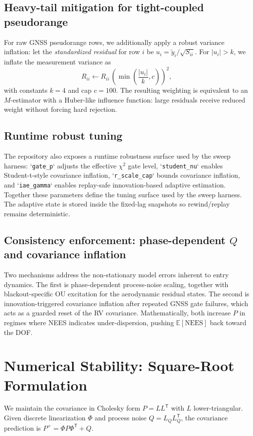 \documentclass[10pt]{article}
\newcommand{\E}{\mathbb{E}}
\newcommand{\trans}{^{\mathsf T}}
\begin{document}
\subsection{Heavy-tail mitigation for tight-coupled pseudorange}
For raw GNSS pseudorange rows, we additionally apply a robust variance inflation:
let the \emph{standardized residual} for row $i$ be $u_i=\tilde y_i/\sqrt{S_{ii}}$.
For $|u_i|>k$, we inflate the measurement variance as
\begin{equation}
  R_{ii} \leftarrow R_{ii}\,\left(\min\!\left(\frac{|u_i|}{k},c\right)\right)^2,
\end{equation}
with constants $k=4$ and cap $c=100$.
The resulting weighting is equivalent to an $M$-estimator with a Huber-like influence function:
large residuals receive reduced weight without forcing hard rejection.

\subsection{Runtime robust tuning}
The repository also exposes a runtime robustness surface used by the sweep harness:
`\texttt{gate\_p}` adjusts the effective $\chi^2$ gate level, `\texttt{student\_nu}` enables Student-t-style covariance inflation, `\texttt{r\_scale\_cap}` bounds covariance inflation, and `\texttt{iae\_gamma}` enables replay-safe innovation-based adaptive estimation. Together these parameters define the tuning surface used by the sweep harness.
The adaptive state is stored inside the fixed-lag snapshots so rewind/replay remains deterministic.

\subsection[Consistency enforcement: phase-dependent Q]{Consistency enforcement: phase-dependent $Q$ and covariance inflation}
Two mechanisms address the non-stationary model errors inherent to entry dynamics. The first is phase-dependent process-noise scaling, together with blackout-specific OU excitation for the aerodynamic residual states. The second is innovation-triggered covariance inflation after repeated GNSS gate failures, which acts as a guarded reset of the RV covariance.
Mathematically, both increase $P$ in regimes where NEES indicates under-dispersion, pushing $\E[\mathrm{NEES}]$ back toward the DOF.

\section{Numerical Stability: Square-Root Formulation}
We maintain the covariance in Cholesky form $P = LL\trans$ with $L$ lower-triangular.
Given discrete linearization $\Phi$ and process noise $Q=L_Q L_Q\trans$, the covariance prediction is
$P^+ = \Phi P \Phi\trans + Q$.
\end{document}
